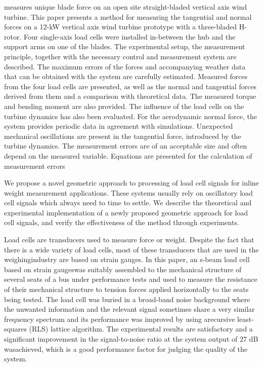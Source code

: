 \documentclass[11pt]{article}
\begin{document}
\citet{Rossander15} measures unique blade force on an open site straight-bladed vertical axis wind turbine. This paper presents a method for measuring the tangential and normal forces on a 12-kW vertical axis wind turbine prototype with a three-bladed H-rotor. Four single-axis load cells were installed in-between the hub and the support arms on one of the blades. The experimental setup, the measurement principle, together with the necessary control and measurement system are described. The maximum errors of the forces and accompanying weather data that can be obtained with the system are carefully estimated. Measured forces from the four load cells are presented, as well as the normal and tangential forces derived from them and a comparison with theoretical data. The measured torque and bending moment are also provided. The influence of the load cells on the turbine dynamics has also been evaluated. For the aerodynamic normal force, the system provides periodic data in agreement with simulations. Unexpected mechanical oscillations are present in the tangential force, introduced by the turbine dynamics. The measurement errors are of an acceptable size and often depend on the measured variable. Equations are presented for the calculation of measurement errors

\citet{Kesilmis16} We propose a novel geometric approach to processing of load cell signals for inline weight measurement applications. These systems usually rely on oscillatory load cell signals which always need to time to settle. We describe the theoretical and experimental implementation of a newly proposed geometric approach for load cell signals, and verify the effectiveness of the method through experiments.

\citet{Hernandez06} Load cells are transducers used to measure force or weight. Despite the fact that there is a wide variety of load cells, most of these transducers that are used in the weighingindustry are based on strain gauges. In this paper, an s-beam load cell based on strain gaugeswas suitably assembled to the mechanical structure of several seats of a bus under performance tests and used to measure the resistance of their mechanical structure to tension forces applied horizontally to the seats being tested. The load cell was buried in a broad-band noise background where the unwanted information and the relevant signal sometimes share a very similar frequency spectrum and its performance was improved by using arecursive least-squares (RLS) lattice algorithm. The experimental results are satisfactory and a significant improvement in the signal-to-noise ratio at the system output of 27 dB wasachieved, which is a good performance factor for judging the quality of the system.
\end{document}

